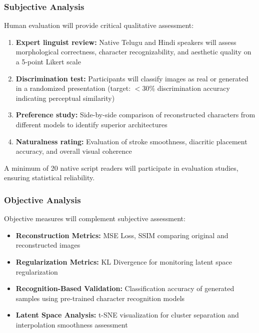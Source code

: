 \documentclass[review]{elsarticle}
\begin{document}
\subsubsection{Subjective Analysis}

Human evaluation will provide critical qualitative assessment:

\begin{enumerate}
\item \textbf{Expert linguist review:} Native Telugu and Hindi speakers will assess morphological correctness, character recognizability, and aesthetic quality on a 5-point Likert scale
\item \textbf{Discrimination test:} Participants will classify images as real or generated in a randomized presentation (target: $< 30$\% discrimination accuracy indicating perceptual similarity)
\item \textbf{Preference study:} Side-by-side comparison of reconstructed characters from different models to identify superior architectures
\item \textbf{Naturalness rating:} Evaluation of stroke smoothness, diacritic placement accuracy, and overall visual coherence
\end{enumerate}

A minimum of 20 native script readers will participate in evaluation studies, ensuring statistical reliability.

\subsubsection{Objective Analysis}

Objective measures will complement subjective assessment:

\begin{itemize}
\item \textbf{Reconstruction Metrics:} MSE Loss, SSIM comparing original and reconstructed images
\item \textbf{Regularization Metrics:} KL Divergence for monitoring latent space regularization
\item \textbf{Recognition-Based Validation:} Classification accuracy of generated samples using pre-trained character recognition models
\item \textbf{Latent Space Analysis:} t-SNE visualization for cluster separation and interpolation smoothness assessment
\end{itemize}
\end{document}
